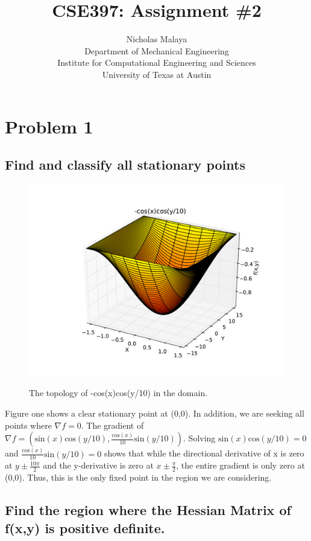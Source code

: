 \documentclass{article}
\title{\bf{CSE397: Assignment \#2}}
\author{Nicholas Malaya \\ Department of Mechanical Engineering \\
Institute for Computational Engineering and Sciences \\ University of
Texas at Austin} \date{}
\begin{document}
\maketitle

\newpage
\section{Problem 1}

\subsection{Find and classify all stationary points}


\begin{figure}[!htb]
  \includegraphics[scale=.5]{figs/1_3d.pdf}
  \label{fig:3d}
  \caption{The topology of -cos(x)cos(y/10) in the domain.} 
\end{figure}

Figure one shows a clear stationary point at (0,0). In addition, we are
seeking all points where $\nabla f = 0$.  The gradient of $\nabla f =
(\text{sin}(x)\text{cos}(y/10),\frac{\text{cos}(x)}{10}\text{sin}(y/10))$. Solving
$\text{sin}(x)\text{cos}(y/10) = 0$  and
$\frac{\text{cos}(x)}{10}\text{sin}(y/10) = 0$ shows that while the
directional derivative of x is zero at $y \pm \frac{10 \pi}{2}$ and the
y-derivative is zero at $x \pm \frac{\pi}{2}$, the entire gradient is
only zero at (0,0). Thus, this is the only fixed point in the region we
are considering. 

\subsection{Find the region where the Hessian Matrix of f(x,y) is positive definite.}
\end{document}
